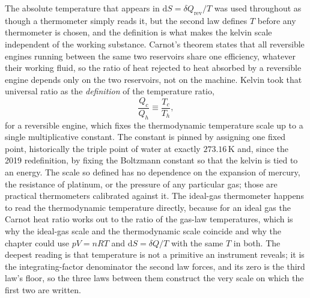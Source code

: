 \begin{mastery}
The absolute temperature that appears in $\mathrm{d}S = \delta Q_{\text{rev}}/T$
was used throughout as though a thermometer simply reads it, but the second law
defines $T$ before any thermometer is chosen, and the definition is what makes the
kelvin scale independent of the working substance. Carnot's theorem states that all
reversible engines running between the same two reservoirs share one efficiency,
whatever their working fluid, so the ratio of heat rejected to heat absorbed by a
reversible engine depends only on the two reservoirs, not on the machine. Kelvin
took that universal ratio as the \emph{definition} of the temperature ratio,
\[
\frac{Q_c}{Q_h} \equiv \frac{T_c}{T_h},
\]
for a reversible engine, which fixes the thermodynamic temperature scale up to a
single multiplicative constant. The constant is pinned by assigning one fixed
point, historically the triple point of water at exactly $273.16\,\si{\kelvin}$ and,
since the 2019 redefinition, by fixing the Boltzmann constant so that the kelvin is
tied to an energy. The scale so defined has no dependence on the expansion of
mercury, the resistance of platinum, or the pressure of any particular gas; those
are practical thermometers calibrated against it. The ideal-gas thermometer happens
to read the thermodynamic temperature directly, because for an ideal gas the Carnot
heat ratio works out to the ratio of the gas-law temperatures, which is why the
ideal-gas scale and the thermodynamic scale coincide and why the chapter could use
$pV = nRT$ and $\mathrm{d}S = \delta Q/T$ with the same $T$ in both. The deepest
reading is that temperature is not a primitive an instrument reveals; it is the
integrating-factor denominator the second law forces, and its zero is the third
law's floor, so the three laws between them construct the very scale on which the
first two are written.
\end{mastery}

